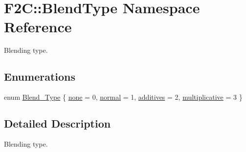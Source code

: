 \hypertarget{namespace_f2_c_1_1_blend_type}{
\section{F2C::BlendType Namespace Reference}
\label{namespace_f2_c_1_1_blend_type}
}


Blending type.  
\subsection*{Enumerations}
\begin{DoxyCompactItemize}
\item 
enum \hyperlink{namespace_f2_c_1_1_blend_type_a582fe2d83fb813041785794568e5a414}{Blend\_\-Type} \{ \hyperlink{namespace_f2_c_1_1_blend_type_a582fe2d83fb813041785794568e5a414a4ebdda04e8a794154e3df41625fbe3d0}{none} =  0, 
\hyperlink{namespace_f2_c_1_1_blend_type_a582fe2d83fb813041785794568e5a414a2084064e21b9f53a30773e369548d025}{normal} =  1, 
\hyperlink{namespace_f2_c_1_1_blend_type_a582fe2d83fb813041785794568e5a414a9acf5136aaba5039673f8ca4b1146b87}{additives} =  2, 
\hyperlink{namespace_f2_c_1_1_blend_type_a582fe2d83fb813041785794568e5a414aa80eb477f2ae8eedf00b1a7b50f8c1c8}{multiplicative} =  3
 \}
\end{DoxyCompactItemize}


\subsection{Detailed Description}
Blending type. 

